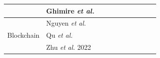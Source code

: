 \documentclass[journal]{IEEEtran}
\newcommand{\cmark}{\ding{51}}
\newcommand{\xmark}{\ding{55}}
\begin{document}
\begin{table}[t]
\begin{tabular}{|l|l|lllll|lll|}
                       &  Ghimire \textit{et al.}~\cite{ghimire2022recent} & \multicolumn{1}{c|}{\cmark} & \multicolumn{1}{c|}{\xmark} & \multicolumn{1}{c|}{\cmark} & \multicolumn{1}{c|}{\xmark} & \multicolumn{1}{c|}{\xmark} & \multicolumn{1}{c|}{\cmark} & \multicolumn{1}{c|}{\cmark} & \multicolumn{1}{c|}{\cmark} \\ \hline
    \multirow{3}{*}{Blockchain}  &  Nguyen \textit{et al.}~\cite{nguyen2021federated} & \multicolumn{1}{c|}{\cmark} & \multicolumn{1}{c|}{\cmark} & \multicolumn{1}{c|}{\cmark} & \multicolumn{1}{c|}{\cmark} & \multicolumn{1}{c|}{\cmark} & \multicolumn{1}{c|}{\cmark} & \multicolumn{1}{c|}{\cmark} & \multicolumn{1}{c|}{\cmark} \\ \cline{2-10} 
                       &  Qu \textit{et al.}~\cite{qu2022blockchain}  & \multicolumn{1}{c|}{\cmark} & \multicolumn{1}{c|}{\cmark} & \multicolumn{1}{c|}{\cmark} & \multicolumn{1}{c|}{\cmark} & \multicolumn{1}{c|}{\cmark} & \multicolumn{1}{c|}{\cmark} & \multicolumn{1}{c|}{\cmark} & \multicolumn{1}{c|}{\cmark} \\ \cline{2-10}
                       &  Zhu \textit{et al.} 2022~\cite{zhu2022blockchain} & \multicolumn{1}{c|}{\cmark} & \multicolumn{1}{c|}{\cmark} & \multicolumn{1}{c|}{\cmark} & \multicolumn{1}{c|}{\cmark} & \multicolumn{1}{c|}{\cmark} & \multicolumn{1}{c|}{\cmark} & \multicolumn{1}{c|}{\cmark} & \multicolumn{1}{c|}{\cmark} \\ \hline
    \end{tabular}
\end{table}
\end{document}
